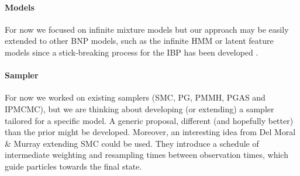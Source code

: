 \paragraph{Models}
For now we focused on infinite mixture models but our approach may be easily extended to other \gls{BNP} models, such as the infinite \acrlong{HMM} \cite{Beal02theinfinite} or latent feature models \cite{Ghahramani:2006tp} since a stick-breaking process for the \acrlong{IBP} has been developed \cite{stick-breaking-ibp}.

\paragraph{Sampler}
For now we worked on existing samplers (\gls{SMC}, \gls{PG}, \gls{PMMH}, \gls{PGAS} and \gls{IPMCMC}), but we are thinking about developing (or extending) a sampler tailored for a specific model. A generic proposal, different (and hopefully better) than the prior might be developed.
Moreover, an interesting idea from Del Moral \& Murray \cite{DelMoral:2015jk} extending \gls{SMC} could be used. They introduce a schedule of intermediate weighting and resampling times between observation times, which guide particles towards the final state.
